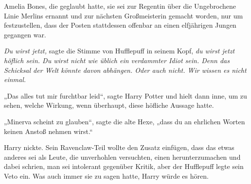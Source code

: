 Amelia Bones, die geglaubt hatte, sie sei zur Regentin über die Ungebrochene Linie Merlins ernannt und zur nächsten Großmeisterin gemacht worden, nur um festzustellen, dass der Posten stattdessen offenbar an einen elfjährigen Jungen gegangen war.

\emph{Du wirst jetzt,} sagte die Stimme von Hufflepuff in seinem Kopf, \emph{du wirst jetzt höflich sein. Du wirst nicht wie üblich ein verdammter Idiot sein. Denn das Schicksal der Welt könnte davon abhängen. Oder auch nicht. Wir wissen es nicht einmal.}

„Das alles tut mir furchtbar leid“, sagte Harry Potter und hielt dann inne, um zu sehen, welche Wirkung, wenn überhaupt, diese höfliche Aussage hatte.

„Minerva scheint zu glauben“, sagte die alte Hexe, „dass du an ehrlichen Worten keinen Anstoß nehmen wirst.“

Harry nickte. Sein Ravenclaw-Teil wollte den Zusatz einfügen, dass das etwas anderes sei als Leute, die unverhohlen versuchten, einen herunterzumachen und dabei schrien, man sei intolerant gegenüber Kritik, aber der Hufflepuff legte sein Veto ein. Was auch immer sie zu sagen hatte, Harry würde es hören.

